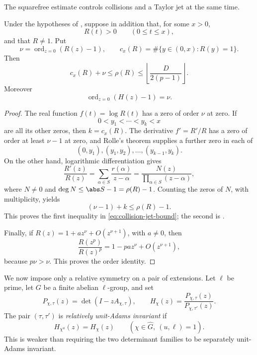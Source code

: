 The squarefree estimate controls collisions and a Taylor jet at the same
time.

\begin{theorem}
\label{thm:collision-jet-inequality}
Under the hypotheses of , suppose in
addition that, for some \(x>0\),
\[
 R(t)>0\qquad(0\le t\le x),
\]
and that \(R\ne1\).  Put
\[
 \nu=\operatorname{ord}_{z=0}(R(z)-1),
 \qquad
 c_x(R)=\#\{y\in(0,x):R(y)=1\}.
\]
Then
\begin{equation}\label{eq:collision-jet-bound}
 c_x(R)+\nu\le\rho(R)
 \le\left\lfloor\frac{D}{2(p-1)}\right\rfloor.
\end{equation}
Moreover
\[
 \operatorname{ord}_{z=0}(H(z)-1)=\nu.
\]
\end{theorem}

\begin{proof}
The real function \(f(t)=\log R(t)\) has a zero of order \(\nu\) at zero.
If
\[
 0<y_1<\cdots<y_k<x
\]
are all its other zeros, then \(k=c_x(R)\).  The derivative
\(f'=R'/R\) has a zero of order at least \(\nu-1\) at zero, and Rolle's
theorem supplies a further zero in each of
\[
 (0,y_1),(y_1,y_2),\ldots,(y_{k-1},y_k).
\]
On the other hand, logarithmic differentiation gives
\[
 \frac{R'(z)}{R(z)}
 =\sum_{\alpha\in S}\frac{r(\alpha)}{z-\alpha}
 =\frac{N(z)}{\prod_{\alpha\in S}(z-\alpha)},
\]
where \(N\ne0\) and \(\deg N\le\abs S-1=\rho(R)-1\).  Counting the
zeros of \(N\), with multiplicity, yields
\[
 (\nu-1)+k\le\rho(R)-1.
\]
This proves the first inequality in \eqref{eq:collision-jet-bound}; the
second is .

Finally, if \(R(z)=1+az^\nu+O(z^{\nu+1})\), with \(a\ne0\), then
\[
 \frac{R(z^p)}{R(z)^p}=1-pa z^\nu+O(z^{\nu+1}),
\]
because \(p\nu>\nu\).  This proves the order identity.
\end{proof}

We now impose only a relative symmetry on a pair of extensions.  Let
\(\ell\) be prime, let \(G\) be a finite abelian \(\ell\)-group, and set
\[
 P_{\chi,\tau}(z)=\det(I-zA_{\chi,\tau}),
 \qquad
 H_\chi(z)=\frac{P_{\chi,\tau}(z)}{P_{\chi,\tau'}(z)}.
\]
The pair \((\tau,\tau')\) is \emph{relatively unit-Adams invariant} if
\begin{equation}\label{eq:relative-unit-adams}
 H_{\chi^u}(z)=H_\chi(z)
 \qquad
 (\chi\in\widehat G,\ (u,\ell)=1).
\end{equation}
This is weaker than requiring the two determinant families to be separately
unit-Adams invariant.

